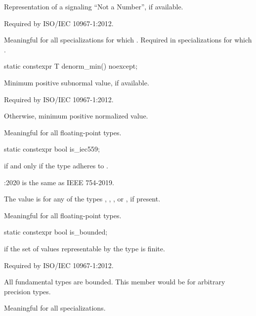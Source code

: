 \begin{itemdescr}
\pnum
Representation of a signaling ``Not a Number'', if available.
\begin{footnote}
Required by ISO/IEC 10967-1:2012.
\end{footnote}

\pnum
Meaningful for all specializations for which
.
Required in specializations for which
.
\end{itemdescr}

%
\begin{itemdecl}
static constexpr T denorm_min() noexcept;
\end{itemdecl}

\begin{itemdescr}
%
\pnum
Minimum positive subnormal value, if available.
\begin{footnote}
Required by ISO/IEC 10967-1:2012.
\end{footnote}
Otherwise, minimum positive normalized value.

\pnum
Meaningful for all floating-point types.
\end{itemdescr}

%
\begin{itemdecl}
static constexpr bool is_iec559;
\end{itemdecl}

\begin{itemdescr}
\pnum
{} if and only if the type adheres to \IsoFloatUndated{}.
\begin{footnote}
\IsoFloatUndated{}:2020 is the same as IEEE 754-2019.
\end{footnote}
\begin{note}
The value is  for any of the types
, , , or ,
if present.
\end{note}

\pnum
Meaningful for all floating-point types.
\end{itemdescr}

%
\begin{itemdecl}
static constexpr bool is_bounded;
\end{itemdecl}

\begin{itemdescr}
\pnum
{} if the set of values representable by the type is finite.
\begin{footnote}
Required by ISO/IEC 10967-1:2012.
\end{footnote}
\begin{note}
All fundamental types are bounded. This member would be  for arbitrary
precision types.
\end{note}

\pnum
Meaningful for all specializations.
\end{itemdescr}

